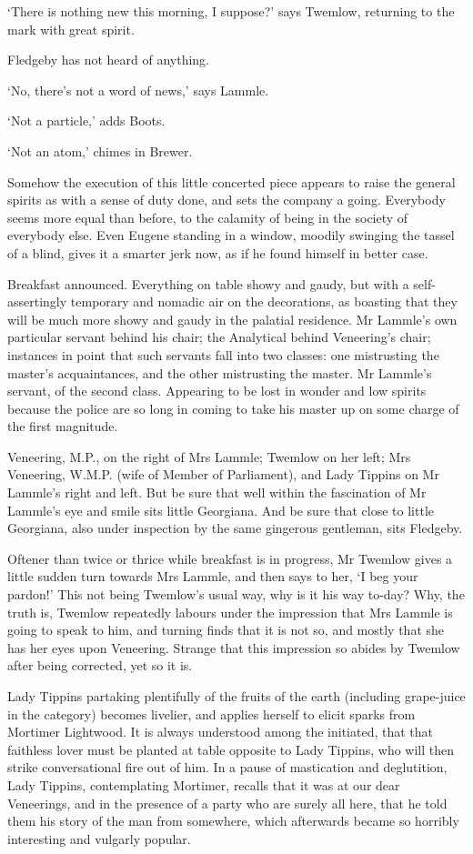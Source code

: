 ‘There is nothing new this morning, I suppose?’ says Twemlow, returning
to the mark with great spirit.

Fledgeby has not heard of anything.

‘No, there’s not a word of news,’ says Lammle.

‘Not a particle,’ adds Boots.

‘Not an atom,’ chimes in Brewer.

Somehow the execution of this little concerted piece appears to raise
the general spirits as with a sense of duty done, and sets the company a
going. Everybody seems more equal than before, to the calamity of being
in the society of everybody else. Even Eugene standing in a window,
moodily swinging the tassel of a blind, gives it a smarter jerk now, as
if he found himself in better case.

Breakfast announced. Everything on table showy and gaudy, but with
a self-assertingly temporary and nomadic air on the decorations, as
boasting that they will be much more showy and gaudy in the palatial
residence. Mr Lammle’s own particular servant behind his chair; the
Analytical behind Veneering’s chair; instances in point that
such servants fall into two classes: one mistrusting the master’s
acquaintances, and the other mistrusting the master. Mr Lammle’s
servant, of the second class. Appearing to be lost in wonder and low
spirits because the police are so long in coming to take his master up
on some charge of the first magnitude.

Veneering, M.P., on the right of Mrs Lammle; Twemlow on her left; Mrs
Veneering, W.M.P. (wife of Member of Parliament), and Lady Tippins on Mr
Lammle’s right and left. But be sure that well within the fascination of
Mr Lammle’s eye and smile sits little Georgiana. And be sure that
close to little Georgiana, also under inspection by the same gingerous
gentleman, sits Fledgeby.

Oftener than twice or thrice while breakfast is in progress, Mr Twemlow
gives a little sudden turn towards Mrs Lammle, and then says to her, ‘I
beg your pardon!’ This not being Twemlow’s usual way, why is it his
way to-day? Why, the truth is, Twemlow repeatedly labours under the
impression that Mrs Lammle is going to speak to him, and turning finds
that it is not so, and mostly that she has her eyes upon Veneering.
Strange that this impression so abides by Twemlow after being corrected,
yet so it is.

Lady Tippins partaking plentifully of the fruits of the earth (including
grape-juice in the category) becomes livelier, and applies herself to
elicit sparks from Mortimer Lightwood. It is always understood among the
initiated, that that faithless lover must be planted at table opposite
to Lady Tippins, who will then strike conversational fire out of him.
In a pause of mastication and deglutition, Lady Tippins, contemplating
Mortimer, recalls that it was at our dear Veneerings, and in the
presence of a party who are surely all here, that he told them his
story of the man from somewhere, which afterwards became so horribly
interesting and vulgarly popular.

